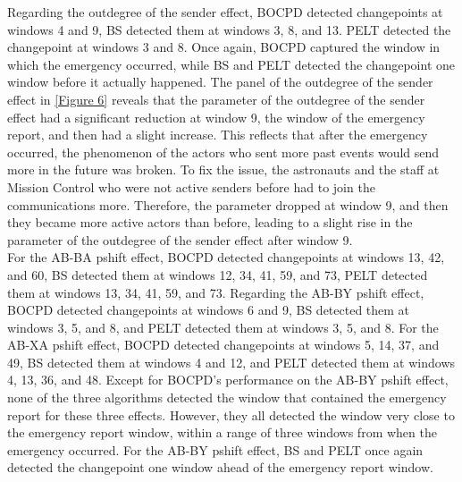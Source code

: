 \documentclass[]{interact}
\theoremstyle{plain}%
\theoremstyle{definition}
\theoremstyle{remark}
\begin{document}
{	Regarding the outdegree of the sender effect, BOCPD detected changepoints at windows 4 and 9, BS detected them at windows 3, 8, and 13. PELT detected the changepoint at windows 3 and 8. Once again, BOCPD captured the window in which the emergency occurred, while BS and PELT detected the changepoint one window before it actually happened. The panel of the outdegree of the sender effect in \autoref{Figure 6} reveals that the parameter of the outdegree of the sender effect had a significant reduction at window 9, the window of the emergency report, and then had a slight increase. This reflects that after the emergency occurred, the phenomenon of the actors who sent more past events would send more in the future was broken. To fix the issue, the astronauts and the staff at Mission Control who were not active senders before had to join the communications more. Therefore, the parameter dropped at window 9, and then they became more active actors than before, leading to a slight rise in the parameter of the outdegree of the sender effect after window 9. \\
	  
    For the AB-BA pshift effect, BOCPD detected changepoints at windows 13, 42, and 60, BS detected them at windows 12, 34, 41, 59, and 73, PELT detected them at windows 13, 34, 41, 59, and 73. Regarding the AB-BY pshift effect, BOCPD detected changepoints at windows 6 and 9, BS detected them at windows 3, 5, and 8, and PELT detected them at windows 3, 5, and 8. For the AB-XA pshift effect, BOCPD detected changepoints at windows 5, 14, 37, and 49, BS detected them at windows 4 and 12, and PELT detected them at windows 4, 13, 36, and 48. Except for BOCPD's performance on the AB-BY pshift effect, none of the three algorithms detected the window that contained the emergency report for these three effects. However, they all detected the window very close to the emergency report window, within a range of three windows from when the emergency occurred. For the AB-BY pshift effect, BS and PELT once again detected the changepoint one window ahead of the emergency report window. \\
	  
}
\end{document}
